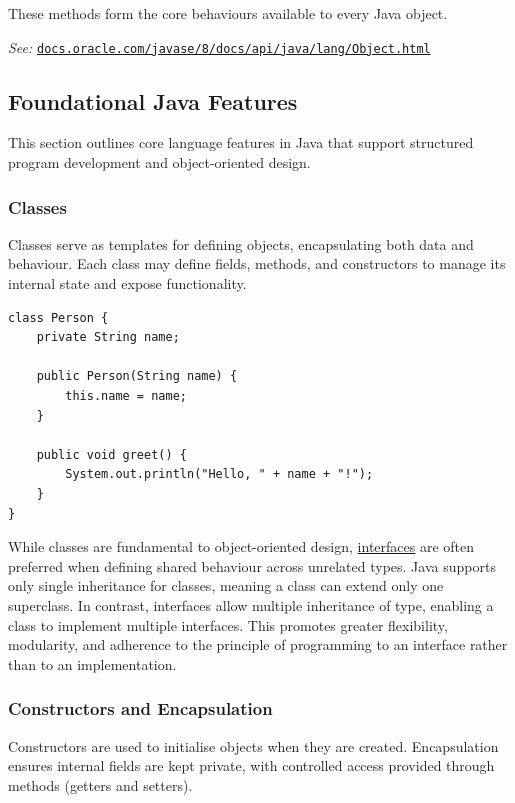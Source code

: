 \documentclass{article}
\begin{document}
These methods form the core behaviours available to every Java object.

\smallskip
\textit{See:} \href{https://docs.oracle.com/javase/8/docs/api/java/lang/Object.html}{\texttt{docs.oracle.com/javase/8/docs/api/java/lang/Object.html}}

\subsection{Foundational Java Features}

This section outlines core language features in Java that support structured program development and object-oriented design.

\subsubsection{Classes}

Classes serve as templates for defining objects, encapsulating both data and behaviour. Each class may define fields, methods, and constructors to manage its internal state and expose functionality.

\begin{verbatim}
class Person {
    private String name;

    public Person(String name) {
        this.name = name;
    }

    public void greet() {
        System.out.println("Hello, " + name + "!");
    }
}
\end{verbatim}

While classes are fundamental to object-oriented design, \hyperref[subsec:interfaces]{interfaces} are often preferred when defining shared behaviour across unrelated types. Java supports only single inheritance for classes, meaning a class can extend only one superclass. In contrast, interfaces allow multiple inheritance of type, enabling a class to implement multiple interfaces. This promotes greater flexibility, modularity, and adherence to the principle of programming to an interface rather than to an implementation.



\subsubsection{Constructors and Encapsulation}

Constructors are used to initialise objects when they are created. Encapsulation ensures internal fields are kept private, with controlled access provided through methods (getters and setters).
\end{document}

